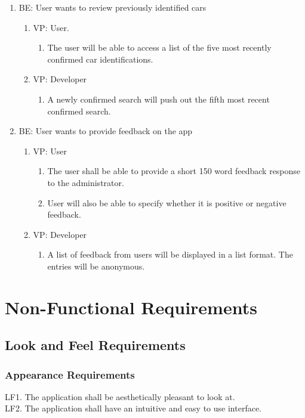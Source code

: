 \documentclass[12pt]{article}
\begin{document}
\begin{enumerate}
	\item BE: User wants to review previously identified cars
	\begin{enumerate}
		\item VP: User.
		\begin{enumerate}
			\item The user will be able to access a list of the five most recently confirmed car identifications.
		\end{enumerate}
		\item VP: Developer
		\begin{enumerate}
			\item A newly confirmed search will push out the fifth most recent confirmed search. 
		\end{enumerate}
	\end{enumerate}

	\item BE: User wants to provide feedback on the app
	\begin{enumerate}
		\item VP: User
		\begin{enumerate}
			\item The user shall be able to provide a short 150 word feedback response to the administrator.
			\item User will also be able to specify whether it is positive or negative feedback.
		\end{enumerate}
		\item VP: Developer
		\begin{enumerate}
			\item A list of feedback from users will be displayed in a list format. The entries will be anonymous.    
		\end{enumerate}
	\end{enumerate}
    
\end{enumerate}

\section{Non-Functional Requirements}
\subsection{Look and Feel Requirements}
\subsubsection{Appearance Requirements}
LF1. The application shall be aesthetically pleasant to look at.\\
LF2. The application shall have an intuitive and easy to use interface.
\end{document}
